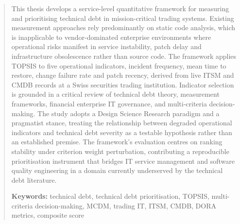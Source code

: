 \documentclass[
  12pt,
  letterpaper,
  12pt,
  oneside,
  english,
  onehalfspacing,
  headsepline]{MastersDoctoralThesis}
\begin{document}
\begin{abstract}
\addchaptertocentry{\abstractname} %
This thesis develops a service-level quantitative framework for
measuring and prioritising technical debt in mission-critical trading
systems. Existing measurement approaches rely predominantly on static
code analysis, which is inapplicable to vendor-dominated enterprise
environments where operational risks manifest in service instability,
patch delay and infrastructure obsolescence rather than source code. The
framework applies TOPSIS to five operational indicators, incident
frequency, mean time to restore, change failure rate and patch recency,
derived from live ITSM and CMDB records at a Swiss securities trading
institution. Indicator selection is grounded in a critical review of
technical debt theory, measurement frameworks, financial enterprise IT
governance, and multi-criteria decision-making. The study adopts a
Design Science Research paradigm and a pragmatist stance, treating the
relationship between degraded operational indicators and technical debt
severity as a testable hypothesis rather than an established premise.
The framework's evaluation centres on ranking stability under criterion
weight perturbation, contributing a reproducible prioritisation
instrument that bridges IT service management and software quality
engineering in a domain currently underserved by the technical debt
literature.

\vspace{2cm}
\noindent\textbf{Keywords:} technical debt, technical debt
prioritisation, TOPSIS, multi-criteria decision-making, MCDM, trading
IT, ITSM, CMDB, DORA metrics, composite score
\end{abstract}



\begin{acknowledgements}
\addchaptertocentry{\acknowledgementname} %

\end{acknowledgements}


% 

\begingroup
\hypersetup{linkcolor=black}

\tableofcontents %

\listoffigures %
\end{document}
